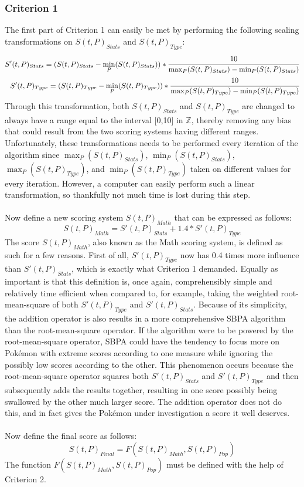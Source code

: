 \documentclass{article}
\begin{document}
\subsubsection{Criterion 1}
The first part of Criterion 1 can easily be met by performing the following scaling transformations on $S(t,P)_{Stats}$ and $S(t,P)_{Type}$:
\begin{eqnarray*}
	S'(t,P)_{Stats}=(S(t,P)_{Stats}-\min_P(S(t,P)_{Stats}))*\cfrac{10}{\max_P(S(t,P)_{Stats})-\min_P(S(t,P)_{Stats})}\\
	S'(t,P)_{Type}=(S(t,P)_{Type}-\min_P(S(t,P)_{Type}))*\cfrac{10}{\max_P(S(t,P)_{Type})-\min_P(S(t,P)_{Type})}
\end{eqnarray*}
Through this transformation, both $S(t,P)_{Stats}$ and $S(t,P)_{Type}$ are changed to always have a range equal to the interval [0,10] in $\mathbb{Z}$, thereby removing any bias that could result from the two scoring systems having different ranges. Unfortunately, these transformations needs to be performed every iteration of the algorithm since $\max_P(S(t,P)_{Stats})$, $\min_P(S(t,P)_{Stats})$, $\max_P(S(t,P)_{Type})$, and $\min_P(S(t,P)_{Type})$ taken on different values for every iteration. However, a computer can easily perform such a linear transformation, so thankfully not much time is lost during this step.\\\\
Now define a new scoring system $S(t,P)_{Math}$ that can be expressed as follows:
\begin{equation*}
	S(t,P)_{Math}=S'(t,P)_{Stats}+1.4*S'(t,P)_{Type}
\end{equation*}
The score $S(t,P)_{Math}$, also known as the Math scoring system, is defined as such for a few reasons. First of all, $S'(t,P)_{Type}$ now has 0.4 times more influence than $S'(t,P)_{Stats}$, which is exactly what Criterion 1 demanded. Equally as important is that this definition is, once again, comprehensibly simple and relatively time efficient when compared to, for example, taking the weighted root-mean-square of both $S'(t,P)_{Type}$ and $S'(t,P)_{Stats}$. Because of its simplicity, the addition operator is also results in a more comprehensive SBPA algorithm than the root-mean-square operator. If the algorithm were to be powered by the root-mean-square operator, SBPA could have the tendency to focus more on Pok\'emon with extreme scores according to one measure while ignoring the possibly low scores according to the other. This phenomenon occurs because the root-mean-square operator squares both $S'(t,P)_{Stats}$ and $S'(t,P)_{Type}$ and then subsequently adds the results together, resulting in one score possibly being swallowed by the other much larger score. The addition operator does not do this, and in fact gives the Pok\'emon under investigation a score it well deserves.\\\\
Now define the final score as follows:
\begin{equation*}
	S(t,P)_{Final}=F(S(t,P)_{Math},S(t,P)_{Pop})
\end{equation*}
The function $F(S(t,P)_{Math},S(t,P)_{Pop})$ must be defined with the help of Criterion 2.
\end{document}
